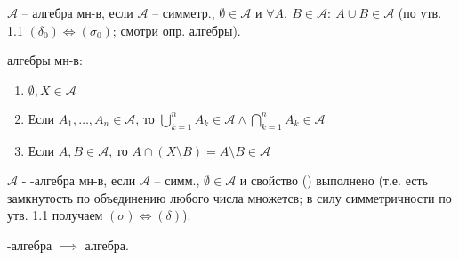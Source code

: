 \begin{definition}
    $\mathcal{A}$ -- алгебра мн-в, если $\mathcal{A}$ -- симметр., $\emptyset \in \mathcal{A}$ и $\forall A, \ B \in \mathcal{A}: \ A \cup B \in \mathcal{A}$ (по утв. 1.1 $(\delta_0) \Leftrightarrow (\sigma_0)$; смотри \href{https://ru.wikipedia.org/wiki/\%D0\%90\%D0\%BB\%D0\%B3\%D0\%B5\%D0\%B1\%D1\%80\%D0\%B0_\%D0\%BC\%D0\%BD\%D0\%BE\%D0\%B6\%D0\%B5\%D1\%81\%D1\%82\%D0\%B2#\%D0\%9E\%D0\%BF\%D1\%80\%D0\%B5\%D0\%B4\%D0\%B5\%D0\%BB\%D0\%B5\%D0\%BD\%D0\%B8\%D0\%B5}{опр. алгебры}).
\end{definition}

\begin{properties}
    алгебры мн-в: 

    \begin{enumerate}
        \item {
            $\emptyset, X \in \mathcal{A}$
        }
        \item Если $A_1, \dots, A_n \in \mathcal{A}$, то $\bigcup_{k = 1}^n A_k \in \mathcal{A} \land \bigcap_{k = 1}^n A_k \in \mathcal{A}$
        \item Если $A, B \in \mathcal{A}$, то $A \cap (X \setminus B) = A \setminus B \in \mathcal{A}$
    \end{enumerate}
\end{properties}

\begin{definition}
    $\mathcal{A}$ - \sigma-алгебра мн-в, если $\mathcal{A}$ -- симм., $\emptyset \in \mathcal{A}$ и свойство (\sigma) выполнено (т.е. есть замкнутость по объединению любого числа множетсв; в силу симметричности по утв. 1.1 получаем $(\sigma) \Leftrightarrow (\delta)$).
\end{definition}

\begin{remark}
    \sigma-алгебра $\implies$ алгебра.
\end{remark}

